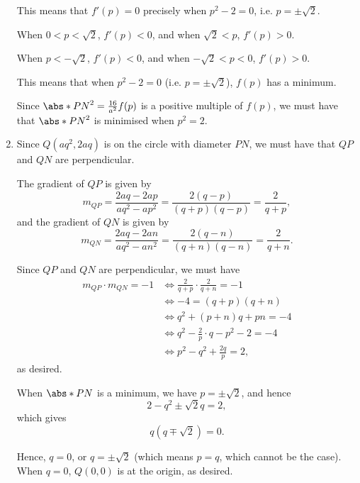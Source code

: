 \begin{enumerate}
          This means that \(f'(p) = 0\) precisely when \(p^2 - 2 = 0\), i.e. \(p = \pm \sqrt{2}\).

          When \(0 < p < \sqrt{2}\), \(f'(p) < 0\), and when \(\sqrt{2} < p\), \(f'(p) > 0\).

          When \(p < -\sqrt{2}\), \(f'(p) < 0\), and when \(-\sqrt{2} < p < 0\), \(f'(p) > 0\).

          This means that when \(p^2 - 2 = 0\) (i.e. \(p = \pm \sqrt{2}\)), \(f(p)\) has a minimum.

          Since \(\abs*{PN}^2 = \frac{16}{a^2} f(p)\) is a positive multiple of \(f(p)\), we must have that \(\abs*{PN}^2\) is minimised when \(p^2 = 2\).

    \item Since \(Q(aq^2, 2aq)\) is on the circle with diameter \(PN\), we must have that \(QP\) and \(QN\) are perpendicular.

          The gradient of \(QP\) is given by
          \[
              m_{QP} = \frac{2aq - 2ap}{aq^2 - ap^2} = \frac{2 (q - p)}{(q + p) (q - p)} = \frac{2}{q + p},
          \]
          and the gradient of \(QN\) is given by
          \[
              m_{QN} = \frac{2aq - 2an}{aq^2 - an^2} = \frac{2 (q - n)}{(q + n) (q - n)} = \frac{2}{q + n}.
          \]

          Since \(QP\) and \(QN\) are perpendicular, we must have
          \begin{align*}
              m_{QP} \cdot m_{QN} = -1 & \iff \frac{2}{q + p} \cdot \frac{2}{q + n} = -1 \\
                                       & \iff -4 = (q + p)(q + n)                        \\
                                       & \iff q^2 + (p + n)q + pn = -4                   \\
                                       & \iff q^2 - \frac{2}{p} \cdot q - p^2 - 2 = -4   \\
                                       & \iff p^2 - q^2 + \frac{2q}{p} = 2,
          \end{align*}
          as desired.

          When \(\abs*{PN}\) is a minimum, we have \(p = \pm \sqrt{2}\), and hence
          \[
              2 - q^2 \pm \sqrt{2}q = 2,
          \]
          which gives
          \[
              q (q \mp \sqrt{2}) = 0.
          \]

          Hence, \(q = 0\), or \(q = \pm \sqrt{2}\) (which means \(p = q\), which cannot be the case). When \(q = 0\), \(Q(0, 0)\) is at the origin, as desired.
\end{enumerate}